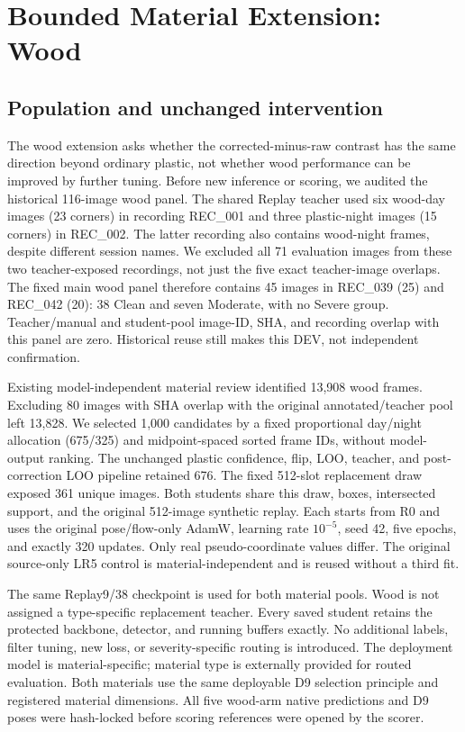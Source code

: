 \section{Bounded Material Extension: Wood}
\subsection{Population and unchanged intervention}
The wood extension asks whether the corrected-minus-raw contrast has the same direction beyond ordinary plastic, not whether wood performance can be improved by further tuning. Before new inference or scoring, we audited the historical 116-image wood panel. The shared Replay teacher used six wood-day images (23 corners) in recording REC\_001 and three plastic-night images (15 corners) in REC\_002. The latter recording also contains wood-night frames, despite different session names. We excluded all 71 evaluation images from these two teacher-exposed recordings, not just the five exact teacher-image overlaps. The fixed main wood panel therefore contains 45 images in REC\_039 (25) and REC\_042 (20): 38 Clean and seven Moderate, with no Severe group. Teacher/manual and student-pool image-ID, SHA, and recording overlap with this panel are zero. Historical reuse still makes this DEV, not independent confirmation.

Existing model-independent material review identified 13,908 wood frames. Excluding 80 images with SHA overlap with the original annotated/teacher pool left 13,828. We selected 1,000 candidates by a fixed proportional day/night allocation (675/325) and midpoint-spaced sorted frame IDs, without model-output ranking. The unchanged plastic confidence, flip, LOO, teacher, and post-correction LOO pipeline retained 676. The fixed 512-slot replacement draw exposed 361 unique images. Both students share this draw, boxes, intersected support, and the original 512-image synthetic replay. Each starts from R0 and uses the original pose/flow-only AdamW, learning rate $10^{-5}$, seed 42, five epochs, and exactly 320 updates. Only real pseudo-coordinate values differ. The original source-only LR5 control is material-independent and is reused without a third fit.

The same Replay9/38 checkpoint is used for both material pools. Wood is not assigned a type-specific replacement teacher. Every saved student retains the protected backbone, detector, and running buffers exactly. No additional labels, filter tuning, new loss, or severity-specific routing is introduced. The deployment model is material-specific; material type is externally provided for routed evaluation. Both materials use the same deployable D9 selection principle and registered material dimensions. All five wood-arm native predictions and D9 poses were hash-locked before scoring references were opened by the scorer.

